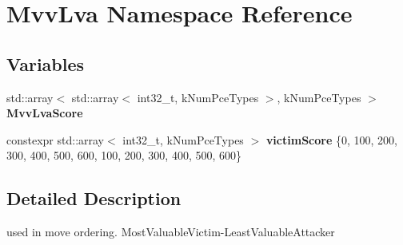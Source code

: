 \hypertarget{namespaceMvvLva}{}\section{Mvv\+Lva Namespace Reference}
\label{namespaceMvvLva}
\subsection*{Variables}
\begin{DoxyCompactItemize}
\item 
\mbox{\label{namespaceMvvLva_a105cf120f19fbd3d0e7820521aaadf0c}} 
std\+::array$<$ std\+::array$<$ int32\+\_\+t, k\+Num\+Pce\+Types $>$, k\+Num\+Pce\+Types $>$ {\bfseries Mvv\+Lva\+Score}
\item 
\mbox{\label{namespaceMvvLva_aa69f18e6e9edabdc70086bd7e3fe7c46}} 
constexpr std\+::array$<$ int32\+\_\+t, k\+Num\+Pce\+Types $>$ {\bfseries victim\+Score} \{0, 100, 200, 300, 400, 500, 600, 100, 200, 300, 400, 500, 600\}
\end{DoxyCompactItemize}


\subsection{Detailed Description}
used in move ordering. Most\+Valuable\+Victim-\/\+Least\+Valuable\+Attacker 